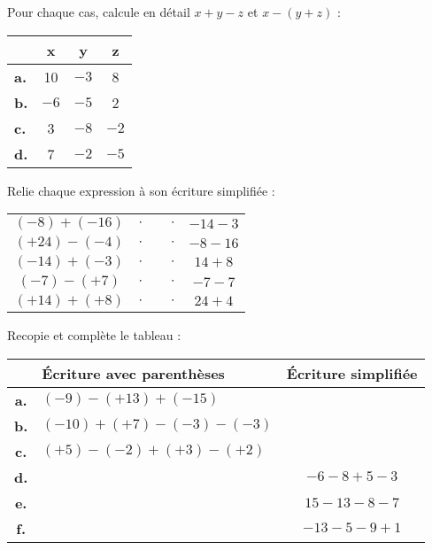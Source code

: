 \begin{exercice}
Pour chaque cas, calcule en détail $x + y - z$ et $x - (y + z)$ :
\begin{center}
\begin{tabularx}{0.4\linewidth}{|X|c|c|c|}
\hline
 & x & y & z \\ \hline
\textbf{a.} & 10 & $- 3$ & 8 \\ \hline
\textbf{b.} & $- 6$ & $- 5$ & 2 \\ \hline
\textbf{c.} & 3 & $- 8$ & $- 2$ \\ \hline
\textbf{d.} & 7 & $- 2$ & $- 5$ \\ \hline
 \end{tabularx}
 \end{center}
\end{exercice}




\begin{exercice}
Relie chaque expression à son écriture simplifiée :
\begin{center}
 \begin{tabularx}{0.8\linewidth}{|cc|X|cc|}
  \cline{1-2}\cline{4-5}
  $(- 8) + (- 16)$ & $\cdot$ & & $\cdot$ & $- 14 - 3$ \\ \cline{1-2}\cline{4-5}
  $(+ 24) - (- 4)$ & $\cdot$ & & $\cdot$ & $- 8 - 16$ \\ \cline{1-2}\cline{4-5}
  $(- 14) + (- 3)$ & $\cdot$ & & $\cdot$ & $14 + 8$ \\ \cline{1-2}\cline{4-5}
  $(- 7) - (+ 7)$ & $\cdot$ & & $\cdot$ & $- 7 - 7$ \\ \cline{1-2}\cline{4-5}
  $(+ 14) + (+ 8)$ & $\cdot$ & & $\cdot$ & $24 + 4$ \\ \cline{1-2}\cline{4-5}
  \end{tabularx}
  \end{center}
\end{exercice}


\begin{exercice}
Recopie et complète le tableau :
\begin{center}
\begin{tabularx}{1.04\linewidth}{|c|X|c|}
\hline
 & Écriture avec parenthèses & Écriture simplifiée \\ \hline
\textbf{a.} & \small{$(- 9) - (+ 13) + (- 15)$} & \\ \hline
\textbf{b.} & \small{$(- 10) + (+ 7) - (- 3) - (- 3)$} & \\ \hline
\textbf{c.} & \small{$(+ 5) - (- 2) + (+ 3) - (+ 2)$} & \\ \hline
\textbf{d.} & & \small{$- 6 - 8 + 5 - 3$} \\ \hline
\textbf{e.} & & \small{$15 - 13 - 8 - 7$} \\ \hline
\textbf{f.} & & \small{$- 13 - 5 - 9 + 1$} \\ \hline
 \end{tabularx}
 \end{center}
\end{exercice}


